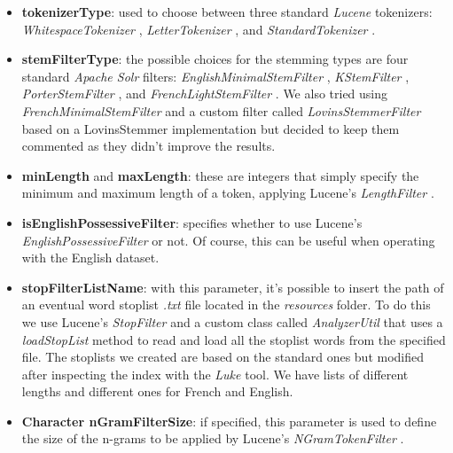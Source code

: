 \begin{itemize}
  \item \textbf{tokenizerType}: used to choose between three standard \textit{Lucene} tokenizers: \textit{WhitespaceTokenizer} \cite{lucenetokenizer}, \textit{LetterTokenizer} \cite{lucenelettertokenizer}, and \textit{StandardTokenizer} \cite{lucenestandardtokenizer}.
  
  \item \textbf{stemFilterType}: the possible choices for the stemming types are four standard \textit{Apache Solr} \cite{solr} filters: \textit{EnglishMinimalStemFilter} \cite{solrminimalstemfilter}, \textit{KStemFilter} \cite{solrkstemfilter}, \textit{PorterStemFilter} \cite{solrporterstemfilter}, and \textit{FrenchLightStemFilter} \cite{solrfrenchlightstemfilter}. 
  We also tried using \textit{FrenchMinimalStemFilter} \cite{solrfrenchminimalstemfilter} and a custom filter called \textit{LovinsStemmerFilter} based on a LovinsStemmer \cite{lucenelovinsstemmer} implementation but decided to keep them commented as they didn't improve the results.
  
  \item \textbf{minLength} and \textbf{maxLength}: these are integers that simply specify the minimum and maximum length of a token, applying Lucene's \textit{LengthFilter} \cite{lucenelengthfilter}.
  
  \item \textbf{isEnglishPossessiveFilter}: specifies whether to use Lucene's \textit{EnglishPossessiveFilter} \cite{luceneenglishpossessivefilter} or not. 
  Of course, this can be useful when operating with the English dataset.
  
  \item \textbf{stopFilterListName}: with this parameter, it's possible to insert the path of an eventual word stoplist \textit{.txt} file located in the \textit{resources} folder. 
  To do this we use Lucene's \textit{StopFilter} \cite{lucenestopfilter} and a custom class called \textit{AnalyzerUtil} that uses a \textit{loadStopList} method to read and load all the stoplist words from the specified file. 
  The stoplists we created are based on the standard ones but modified after inspecting the index with the \textit{Luke} \cite{luke} tool. 
  We have lists of different lengths and different ones for French and English.
  
  \item \textbf{Character nGramFilterSize}: if specified, this parameter is used to define the size of the n-grams to be applied by Lucene's \textit{NGramTokenFilter} \cite{lucenengramtokenfilter}.
  

\end{itemize}

